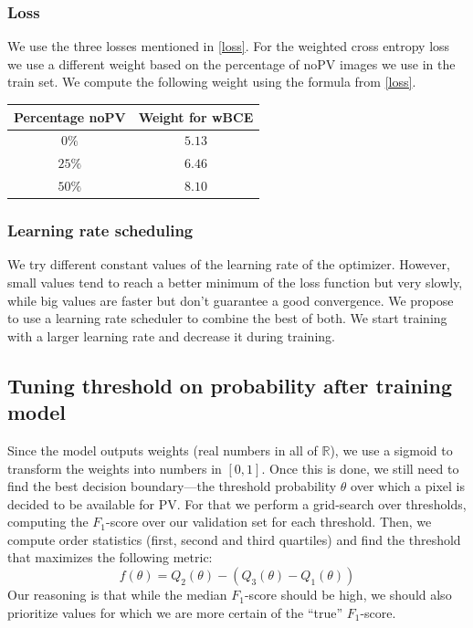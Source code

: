 \documentclass[10pt,conference]{IEEEtran}
\begin{document}
\subsubsection{Loss}
We use the three losses mentioned in \autoref{loss}. For the weighted cross entropy loss we use a different weight based on the percentage of noPV images we use in the train set. We compute the following weight using the formula from \autoref{loss}.
\begin{center}
    \begin{tabular}{||c | c||} 
        \hline
        Percentage noPV & Weight for wBCE\\ [0.5ex] 
        \hline\hline
        $0\%$ & $5.13$ \\
        \hline
        $25\%$ & $6.46$ \\
        \hline
        $50\%$ & $8.10$ \\
        \hline
    \end{tabular}
\end{center}

\subsubsection{Learning rate scheduling}
We try different constant values of the learning rate of the optimizer. However, small values tend to reach a better minimum of the loss function but very slowly, while big values are faster but don't guarantee a good convergence. We propose to use a learning rate scheduler to combine the best of both. We start training with a larger learning rate and decrease it during training.

\subsection{Tuning threshold on probability after training model}
Since the model outputs weights (real numbers in all of $\mathbb{R}$),
we use a sigmoid to transform the weights into numbers in $[0,1]$.
Once this is done, we still need to find the best decision boundary---the threshold probability $\theta$ over which a pixel is decided to be available for PV.
For that we perform a grid-search over thresholds, computing the $F_1$-score over our validation set
for each threshold.
Then, we compute order statistics (first, second and third quartiles) and find the threshold that maximizes the following metric:
\begin{equation} \label{eq:threshold_metric}
    f(\theta) = Q_2(\theta) - (Q_3(\theta) - Q_1(\theta))
\end{equation}
Our reasoning is that while the median $F_1$-score
should be high, we should also prioritize
values for which we are more certain of the ``true'' $F_1$-score.
\end{document}
